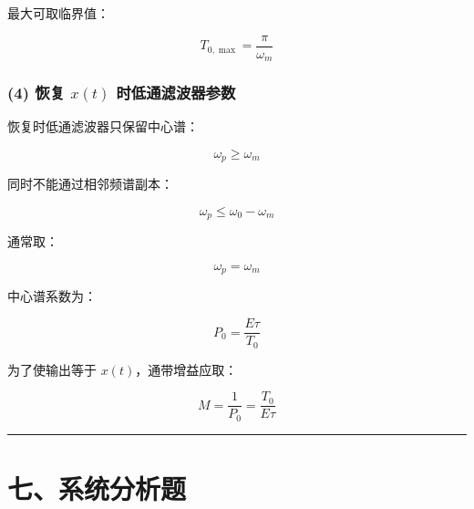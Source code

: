 \documentclass[11pt]{ctexart}
\begin{document}
最大可取临界值：\par



\[

T_{0,\max}=\frac{\pi}{\omega_m}

\]



\subsubsection*{(4) 恢复 \(x(t)\) 时低通滤波器参数}



恢复时低通滤波器只保留中心谱：\par



\[

\omega_p\ge \omega_m

\]



同时不能通过相邻频谱副本：\par



\[

\omega_p\le \omega_0-\omega_m

\]



通常取：\par



\[

\omega_p=\omega_m

\]



中心谱系数为：\par



\[

P_0=\frac{E\tau}{T_0}

\]



为了使输出等于 \(x(t)\)，通带增益应取：\par



\[

M=\frac{1}{P_0}=\frac{T_0}{E\tau}

\]



\medskip\hrule\medskip



\section*{七、系统分析题}
\end{document}
